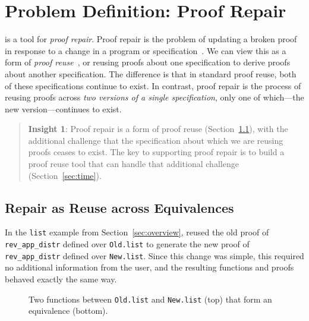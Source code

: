 \section{Problem Definition: Proof Repair}
\label{sec:key1}

\toolname is a tool for \textit{proof repair}.
Proof repair is the problem of updating a broken proof in response to a change in a program or specification~\cite{PGL-045, pumpkinpatch}.
We can view this as a form of 
\textit{proof reuse}~\cite{Ringer2019, felty1994generalization, caplan1995logical, pons2000generalization, johnsen2004theorem}, %
or reusing proofs about one specification to derive proofs about another specification.
The difference is that in standard proof reuse, both of these specifications continue to exist.
In contrast, proof repair is the process of reusing proofs across \textit{two versions of a single specification},
only one of which---the new version---continues to exist.

\begin{quote}
\textbf{Insight 1}:
Proof repair is a form of proof reuse (Section~\ref{sec:repair}), with the additional
challenge that the specification about which
we are reusing proofs ceases to exist.
The key to supporting proof repair is to build a proof reuse
tool that can handle that additional challenge (Section~\ref{sec:time}).
\end{quote}

\subsection{Repair as Reuse across Equivalences}
\label{sec:repair}

In the \lstinline{list} example from Section~\ref{sec:overview}, \toolname
reused the old proof of \lstinline{rev_app_distr} defined over \lstinline{Old.list}
to generate the new proof of \lstinline{rev_app_distr} defined over \lstinline{New.list}.
Since this change was simple, this required no additional information from the user, and the resulting functions
and proofs behaved exactly the same way.

\begin{figure}
\begin{minipage}{0.48\textwidth}
\codeauto{}
\end{minipage}
\codeauto{\hfill}
\begin{minipage}{0.48\textwidth}
\codeauto{}
\end{minipage}
\caption{Two functions between \lstinline{Old.list} and \lstinline{New.list} (top) that form an equivalence (bottom).}
\label{fig:equivalence}
\end{figure}

